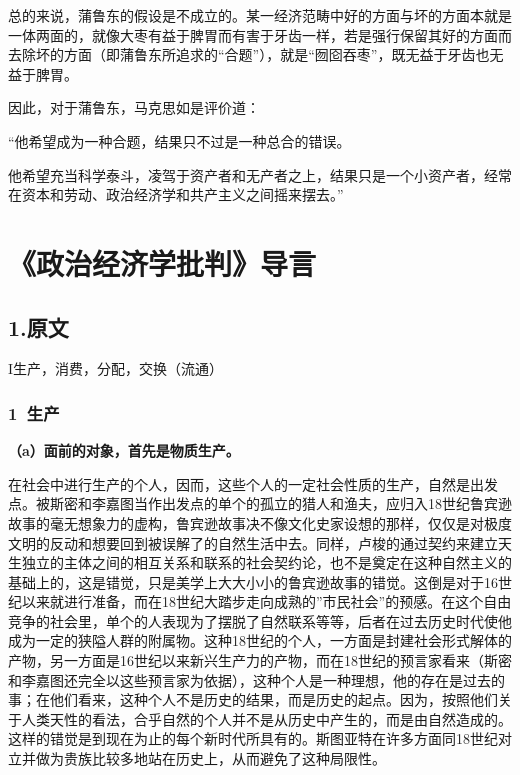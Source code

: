 \documentclass[a4paper,twoside,12pt,AutoFakeBold]{ctexart}
\begin{document}
总的来说，蒲鲁东的假设是不成立的。某一经济范畴中好的方面与坏的方面本就是一体两面的，就像大枣有益于脾胃而有害于牙齿一样，若是强行保留其好的方面而去除坏的方面（即蒲鲁东所追求的“合题”），就是“囫囵吞枣”，既无益于牙齿也无益于脾胃。

因此，对于蒲鲁东，马克思如是评价道：

\begin{fangsong}
    “他希望成为一种合题，结果只不过是一种总合的错误。

    他希望充当科学泰斗，凌驾于资产者和无产者之上，结果只是一个小资产者，经常在资本和劳动、政治经济学和共产主义之间摇来摆去。”
\end{fangsong}




\newpage
\section{《政治经济学批判》导言}
\subsection{1.原文}
\begin{center}
 I生产，消费，分配，交换（流通）    
\end{center}
\subsubsection{1~生产}
\textbf{（a）面前的对象，首先是物质生产。}

在社会中进行生产的个人，因而，这些个人的一定社会性质的生产，自然是出发点。被斯密和李嘉图当作出发点的单个的孤立的猎人和渔夫，应归入18世纪鲁宾逊故事的毫无想象力的虚构，鲁宾逊故事决不像文化史家设想的那样，仅仅是对极度文明的反动和想要回到被误解了的自然生活中去。同样，卢梭的通过契约来建立天生独立的主体之间的相互关系和联系的社会契约论，也不是奠定在这种自然主义的基础上的，这是错觉，只是美学上大大小小的鲁宾逊故事的错觉。这倒是对于16世纪以来就进行准备，而在18世纪大踏步走向成熟的”市民社会”的预感。在这个自由竞争的社会里，单个的人表现为了摆脱了自然联系等等，后者在过去历史时代使他成为一定的狭隘人群的附属物。这种18世纪的个人，一方面是封建社会形式解体的产物，另一方面是16世纪以来新兴生产力的产物，而在18世纪的预言家看来（斯密和李嘉图还完全以这些预言家为依据），这种个人是一种理想，他的存在是过去的事；在他们看来，这种个人不是历史的结果，而是历史的起点。因为，按照他们关于人类天性的看法，合乎自然的个人并不是从历史中产生的，而是由自然造成的。这样的错觉是到现在为止的每个新时代所具有的。斯图亚特在许多方面同18世纪对立并做为贵族比较多地站在历史上，从而避免了这种局限性。
\end{document}
